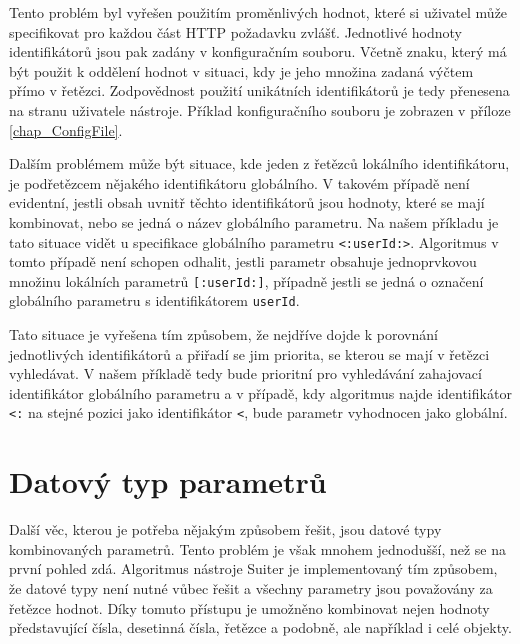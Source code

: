 Tento problém byl vyřešen použitím proměnlivých hodnot, které si uživatel může specifikovat pro každou část HTTP požadavku zvlášť. Jednotlivé hodnoty identifikátorů jsou pak zadány v konfiguračním souboru. Včetně znaku, který má být použit k oddělení hodnot v situaci, kdy je jeho množina zadaná výčtem přímo v řetězci. Zodpovědnost použití unikátních identifikátorů je tedy přenesena na stranu uživatele nástroje. Příklad konfiguračního souboru je zobrazen v příloze \ref{chap_ConfigFile}. 


Dalším problémem může být situace, kde jeden z řetězců lokálního identifikátoru, je podřetězcem nějakého identifikátoru globálního. V takovém případě není evidentní, jestli obsah uvnitř těchto identifikátorů jsou hodnoty, které se mají kombinovat, nebo se jedná o název globálního parametru. Na našem příkladu je tato situace vidět u specifikace globálního parametru \texttt{<:userId:>}. Algoritmus v tomto případě není schopen odhalit, jestli parametr obsahuje jednoprvkovou množinu lokálních parametrů \texttt{[:userId:]}, případně jestli se jedná o označení globálního parametru s identifikátorem \texttt{userId}.

Tato situace je vyřešena tím způsobem, že nejdříve dojde k porovnání jednotlivých identifikátorů a přiřadí se jim priorita, se kterou se mají v řetězci vyhledávat. V našem příkladě tedy bude prioritní pro vyhledávání zahajovací identifikátor globálního parametru a v případě, kdy algoritmus najde identifikátor \texttt{<:} na stejné pozici jako identifikátor \texttt{<}, bude parametr vyhodnocen jako globální.



 \section{Datový typ parametrů}

 Další věc, kterou je potřeba nějakým způsobem řešit, jsou datové typy kombinovaných parametrů. Tento problém je však mnohem jednodušší, než se na první pohled zdá. Algoritmus nástroje Suiter je implementovaný tím způsobem, že datové typy není nutné vůbec řešit a všechny parametry jsou považovány za řetězce hodnot. Díky tomuto přístupu je umožněno kombinovat nejen hodnoty představující čísla, desetinná čísla, řetězce a podobně, ale například i celé objekty. 

